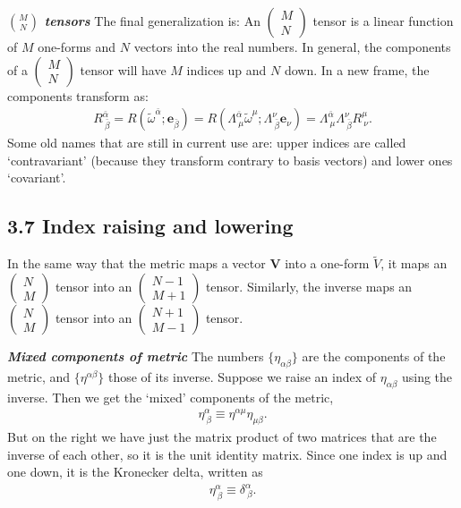 \documentclass[12pt]{book}
\begin{document}
    \textit{\textbf{\(\binom{M}{N}\) tensors}}
    The final generalization is:
    An \(\left(\begin{array}{c} M \\ N \end{array}\right)\) tensor is a linear function of \(M\) one-forms and \(N\) vectors into the real numbers.
    In general, the components of a \(\left(\begin{array}{c} M \\ N \end{array}\right)\) tensor will have \(M\) indices up and \(N\) down. In a new frame, the components transform as:
    \begin{align}
    R^{\bar{\alpha}}_{\ \bar{\beta}} = R(\tilde{\omega}^{\bar{\alpha}}; \mathbf{e}_{\bar{\beta}})
    = R\left(\Lambda^{\bar{\alpha}}_{\ \mu} \tilde{\omega}^{\mu}; \Lambda^{\nu}_{\ \bar{\beta}} \mathbf{e}_{\nu}\right)
    = \Lambda^{\bar{\alpha}}_{\ \mu} \Lambda^{\nu}_{\ \bar{\beta}} R^{\mu}_{\ \nu}. \tag{3.55}
    \end{align}
    Some old names that are still in current use are: upper indices are called ‘contravariant’ (because they transform contrary to basis vectors) and lower ones ‘covariant’.

    \subsection{3.7 Index raising and lowering}
    In the same way that the metric maps a vector \(\mathbf{V}\) into a one-form \(\tilde{V}\), it maps an \(\left(\begin{array}{c} N \\ M \end{array}\right)\) tensor into an \(\left(\begin{array}{c} N-1 \\ M+1 \end{array}\right)\) tensor. Similarly, the inverse maps an \(\left(\begin{array}{c} N \\ M \end{array}\right)\) tensor into an \(\left(\begin{array}{c} N+1 \\ M-1 \end{array}\right)\) tensor.

    \textit{\textbf{Mixed components of metric}}
    The numbers \(\{\eta_{\alpha\beta}\}\) are the components of the metric, and \(\{\eta^{\alpha\beta}\}\) those of its inverse. Suppose we raise an index of \(\eta_{\alpha\beta}\) using the inverse. Then we get the ‘mixed’ components of the metric,
    \begin{align}
    \eta^\alpha_{\ \beta} \equiv \eta^{\alpha\mu} \eta_{\mu\beta}. \tag{3.59}
    \end{align}
    But on the right we have just the matrix product of two matrices that are the inverse of each other, so it is the unit identity matrix. Since one index is up and one down, it is the Kronecker delta, written as
    \begin{align}
    \eta^\alpha_{\ \beta} \equiv \delta^\alpha_{\ \beta}. \tag{3.60}
    \end{align}
\end{document}
